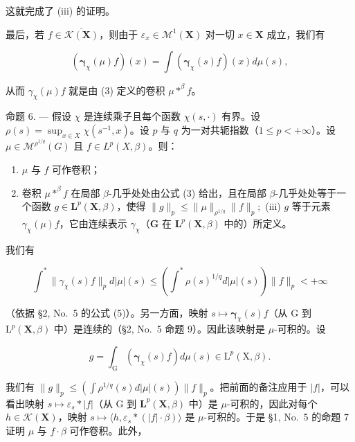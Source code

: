 这就完成了 (iii) 的证明。

最后，若 \(f \in \overline{\mathcal{K}(\mathbf{X})}\)，则由于 \(\varepsilon_x \in \mathcal{M}^1(\mathbf{X})\) 对一切 \(x \in \mathbf{X}\) 成立，我们有

\[
\left(\boldsymbol {\gamma} _ {\chi} (\mu) f\right) (x) = \int \left(\boldsymbol {\gamma} _ {\chi} (s) f\right) (x) d \mu (s),
\]

从而 \(\gamma_{\chi}(\mu)f\) 就是由 (3) 定义的卷积 \(\mu *^{\beta}f\)。

命题 6. --- 假设 \(\chi\) 是连续乘子且每个函数 \(\chi(s, \cdot)\) 有界。设 \(\rho(s) = \sup_{x \in X} \chi(s^{-1}, x)\)。设 \(p\) 与 \(q\) 为一对共轭指数（\(1 \leqslant p < +\infty\)）。设 \(\mu \in \mathcal{M}^{\rho^{1/q}}(G)\) 且 \(f \in L^{p}(X, \beta)\)。则：

\begin{enumerate}
\def\labelenumi{(\roman{enumi})}
\item
  \(\mu\) 与 \(f\) 可作卷积；
\item
  卷积 \(\mu * ^ {\beta} f\) 在局部 \(\beta\)-几乎处处由公式 (3) 给出，且在局部 \(\beta\)-几乎处处等于一个函数 \(g\in \mathbf{L}^p (\mathbf{X},\beta)\)，使得 \(\| g\| _p\leqslant \| \mu \|_{\rho^{1 / q}}\| f\| _p;\) (iii) \(g\) 等于元素 \(\gamma_{\chi}(\mu)f\)，它由连续表示 \(\gamma_{\chi}\)（\(\mathbf{G}\) 在 \(\mathbf{L}^p (\mathbf{X},\beta)\) 中的）所定义。
\end{enumerate}

我们有

\[
\int^ {*} \| \gamma_ {\chi} (s) f \| _ {p} d | \mu | (s) \leqslant \left(\int^ {*} \rho (s) ^ {1 / q} d | \mu | (s)\right) \| f \| _ {p} <   + \infty
\]

（依据 §2, No.~5 的公式 (5)）。另一方面，映射 \(s \mapsto \pmb{\gamma}_{\chi}(s)f\)（从 G 到 \(\mathrm{L}^p (\mathbf{X},\beta)\) 中）是连续的（§2, No.~5 命题 9）。因此该映射是 \(\mu\)-可积的。设

\[
g = \int_ {\mathrm{G}} \left(\boldsymbol {\gamma} _ {\chi} (s) f\right) d \mu (s) \in \mathrm{L} ^ {p} (\mathrm{X}, \beta).
\]

我们有 \(\| g\| _p\leqslant \left(\int \rho^{1 / q}(s)d|\mu |(s)\right)\| f\| _p\)。把前面的备注应用于 \(|f|\)，可以看出映射 \(s\mapsto \varepsilon_s*\mid f|\)（从 G 到 \(\mathbf{L}^p (\mathbf{X},\beta)\) 中）是 \(\mu\)-可积的，因此对每个 \(h\in \mathcal{K}(\mathbf{X})\)，映射 \(s\mapsto \langle h,\varepsilon_s*(|f|\cdot \beta)\rangle\) 是 \(\mu\)-可积的。于是 §1, No.~5 的命题 7 证明 \(\mu\) 与 \(f\cdot \beta\) 可作卷积。此外，

